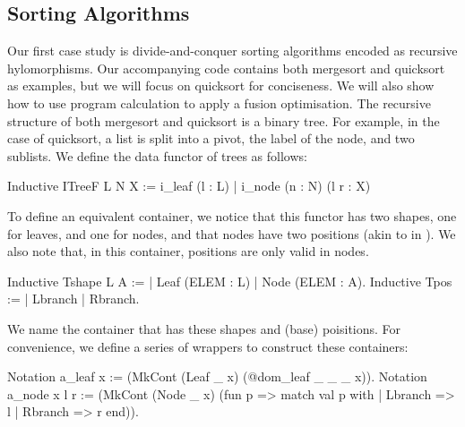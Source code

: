 \documentclass[a4paper,anonymous, UKenglish,cleveref, autoref, thm-restate]{lipics-v2021}
\newcommand{\mpav}[1]{\textcolor{red}{\textsc{Marco}: #1}}
\newcommand{\mvol}[1]{\textcolor{blue}{\textsc{Michael}: #1}}
\begin{document}
%
%

\subsection{Sorting Algorithms}\label{sec:sorting}
Our first case study is divide-and-conquer sorting algorithms encoded as
recursive hylomorphisms. Our accompanying code contains both mergesort and
quicksort as examples, but we will focus on quicksort for conciseness. We will
also show how to use program calculation to apply a fusion optimisation.  The
recursive structure of both mergesort and quicksort is a binary tree. For
example, in the case of quicksort, a list is split into a pivot, the label of
the node, and two sublists. We define the data functor of trees as follows:
\begin{coqcode}
Inductive ITreeF L N X := i_leaf (l : L) | i_node (n : N) (l r : X)
\end{coqcode}
To define an equivalent container, we notice that this functor has two shapes,
one for leaves, and one for nodes, and that nodes have two positions (akin to
 in ). We also note that, in this container, positions
are only valid in nodes.
\begin{coqcode}
Inductive Tshape L A := | Leaf (ELEM : L) | Node (ELEM : A).
Inductive Tpos := | Lbranch | Rbranch. 
\end{coqcode}
We name  the container that has these shapes and (base) poisitions.
For convenience, we define a series of wrappers to construct these containers:
\begin{coqcode}
Notation a_leaf x := (MkCont (Leaf _ x) (@dom_leaf _ _ _ x)).
Notation a_node x l r := (MkCont (Node _ x)
  (fun p => match val p with | Lbranch => l | Rbranch => r end)).
\end{coqcode}
\end{document}

